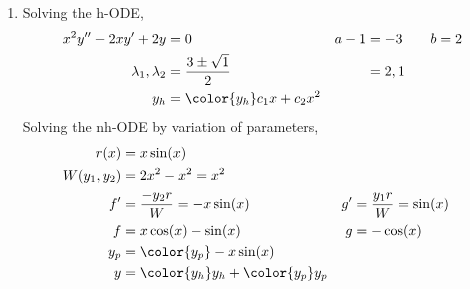 \begin{enumerate}
    \item Solving the h-ODE,
          \begin{align}
              x^{2}y'' - 2xy' + 2y     & = 0                                 &
              a - 1                    & = -3 \qquad b = 2                     \\
              \lambda_{1}, \lambda_{2} & = \frac{3 \pm \sqrt{1}}{2}          &
                                       & = 2, 1                                \\
              y_{h}                    & = {\color{y_h} c_{1}x + c_{2}x^{2}}
          \end{align}
          Solving the nh-ODE by variation of parameters,
          \begin{align}
              r(x)            & = x\sin(x)                                    \\
              W(y_{1}, y_{2}) & = 2x^{2} - x^{2} = x^{2}                      \\
              f'              & = \frac{-y_{2}r}{W} = -x\sin(x)             &
              g'              & = \frac{y_{1}r}{W} = \sin(x)                  \\
              f               & = x\cos(x) - \sin(x)                        &
              g               & = -\cos(x)                                    \\
              y_{p}           & = {\color{y_p} -x\sin(x)}                     \\
              y               & = {\color{y_h} y_{h}} + {\color{y_p} y_{p}}
          \end{align}


\end{enumerate}
